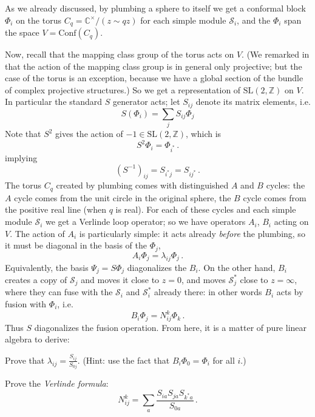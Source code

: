 \documentclass[12pt,letterpaper,reqno]{amsart}
\numberwithin{equation}{section}
\newcommand{\cS}{\ensuremath{\mathcal S}}
\newcommand{\bbC}{\ensuremath{\mathbb C}}
\newcommand{\bbZ}{\ensuremath{\mathbb Z}}
\newcommand{\SL}{\mathrm{SL}}
\newcommand{\Conf}{\textrm{Conf}}
\newcommand{\ti}[1]{\textit{#1}}
\DeclareRobustCommand{\fixme}[1]{\leavevmode{\color{orange}[#1]}}
\begin{document}
As we already discussed,
by plumbing a sphere to itself we get
a conformal block $\Phi_i$ on the torus $C_q = \bbC^\times / (z \sim qz)$ for each simple module $\cS_i$,
and the $\Phi_i$ span the space $V = \Conf(C_q)$.

Now, recall that the mapping class group of the torus acts on $V$.
(We remarked in \fixme{...} that the action of the mapping class
group is in general only projective; but the case of the torus is an
exception, because we have a global section of the bundle of complex
projective structures.) So we get a representation of $\SL(2,\bbZ)$ on $V$.
In particular the standard $S$ generator acts; let $S_{ij}$ denote its
matrix elements, i.e.
\begin{equation}
  S(\Phi_i) = \sum_j S_{ij} \Phi_j
\end{equation}
Note that $S^2$ gives the action of $-1 \in \SL(2,\bbZ)$, which is
\begin{equation}
  S^2 \Phi_i = \Phi_{i^*} \, .
\end{equation}
implying
\begin{equation}
  (S^{-1})_{ij} = S_{i^* j} = S_{i j^*} \, .
\end{equation}
The torus $C_q$ created by plumbing comes with distinguished
$A$ and $B$ cycles: the $A$ cycle comes from the unit circle in the
original sphere, the $B$ cycle comes from the positive real line (when 
$q$ is real).
For each of these cycles and each simple module $\cS_i$ we get
a Verlinde loop operator; so we have operators $A_i$, $B_i$ acting
on $V$.
The action of $A_i$ is particularly simple: it acts already
\ti{before} the plumbing, so it must be diagonal in the basis of 
the $\Phi_j$, 
\begin{equation}
  A_i \Phi_j = \lambda_{ij} \Phi_j \, .
\end{equation}
Equivalently, the basis
$\Psi_j = S \Phi_j$ diagonalizes the $B_i$.
On the other hand, $B_i$ creates a copy of $\cS_j$ and moves it
close to $z = 0$, and moves $\cS_j^*$ close to $z = \infty$,
where they can fuse with the $\cS_i$ and $\cS_i^*$ already there:
in other words $B_i$ acts by fusion with $\Phi_i$, i.e.
\begin{equation}
  B_i \Phi_j = N_{ij}^k \Phi_k \, .
\end{equation}
Thus $S$ diagonalizes the fusion operation. From here, it is a 
matter of pure linear algebra to derive:
\begin{exercise}
Prove that $\lambda_{ij} = \frac{S_{ij}}{S_{0j}}$. (Hint: use the
fact that $B_i \Phi_0 = \Phi_i$ for all $i$.)
\end{exercise}
\begin{exercise}
Prove the \ti{Verlinde formula}: 
\begin{equation}
  N_{ij}^k = \sum_a \frac{S_{ia} S_{ja} S_{k^* a}}{S_{0a}} \, .
\end{equation}
\end{exercise}
\end{document}

